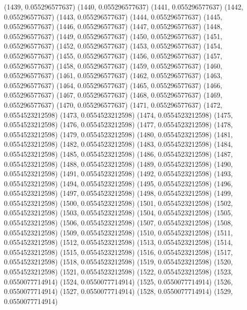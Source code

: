 {					(1439, 0.055296577637)
					(1440, 0.055296577637)
					(1441, 0.055296577637)
					(1442, 0.055296577637)
					(1443, 0.055296577637)
					(1444, 0.055296577637)
					(1445, 0.055296577637)
					(1446, 0.055296577637)
					(1447, 0.055296577637)
					(1448, 0.055296577637)
					(1449, 0.055296577637)
					(1450, 0.055296577637)
					(1451, 0.055296577637)
					(1452, 0.055296577637)
					(1453, 0.055296577637)
					(1454, 0.055296577637)
					(1455, 0.055296577637)
					(1456, 0.055296577637)
					(1457, 0.055296577637)
					(1458, 0.055296577637)
					(1459, 0.055296577637)
					(1460, 0.055296577637)
					(1461, 0.055296577637)
					(1462, 0.055296577637)
					(1463, 0.055296577637)
					(1464, 0.055296577637)
					(1465, 0.055296577637)
					(1466, 0.055296577637)
					(1467, 0.055296577637)
					(1468, 0.055296577637)
					(1469, 0.055296577637)
					(1470, 0.055296577637)
					(1471, 0.055296577637)
					(1472, 0.0554523212598)
					(1473, 0.0554523212598)
					(1474, 0.0554523212598)
					(1475, 0.0554523212598)
					(1476, 0.0554523212598)
					(1477, 0.0554523212598)
					(1478, 0.0554523212598)
					(1479, 0.0554523212598)
					(1480, 0.0554523212598)
					(1481, 0.0554523212598)
					(1482, 0.0554523212598)
					(1483, 0.0554523212598)
					(1484, 0.0554523212598)
					(1485, 0.0554523212598)
					(1486, 0.0554523212598)
					(1487, 0.0554523212598)
					(1488, 0.0554523212598)
					(1489, 0.0554523212598)
					(1490, 0.0554523212598)
					(1491, 0.0554523212598)
					(1492, 0.0554523212598)
					(1493, 0.0554523212598)
					(1494, 0.0554523212598)
					(1495, 0.0554523212598)
					(1496, 0.0554523212598)
					(1497, 0.0554523212598)
					(1498, 0.0554523212598)
					(1499, 0.0554523212598)
					(1500, 0.0554523212598)
					(1501, 0.0554523212598)
					(1502, 0.0554523212598)
					(1503, 0.0554523212598)
					(1504, 0.0554523212598)
					(1505, 0.0554523212598)
					(1506, 0.0554523212598)
					(1507, 0.0554523212598)
					(1508, 0.0554523212598)
					(1509, 0.0554523212598)
					(1510, 0.0554523212598)
					(1511, 0.0554523212598)
					(1512, 0.0554523212598)
					(1513, 0.0554523212598)
					(1514, 0.0554523212598)
					(1515, 0.0554523212598)
					(1516, 0.0554523212598)
					(1517, 0.0554523212598)
					(1518, 0.0554523212598)
					(1519, 0.0554523212598)
					(1520, 0.0554523212598)
					(1521, 0.0554523212598)
					(1522, 0.0554523212598)
					(1523, 0.0550077714914)
					(1524, 0.0550077714914)
					(1525, 0.0550077714914)
					(1526, 0.0550077714914)
					(1527, 0.0550077714914)
					(1528, 0.0550077714914)
					(1529, 0.0550077714914)
}
